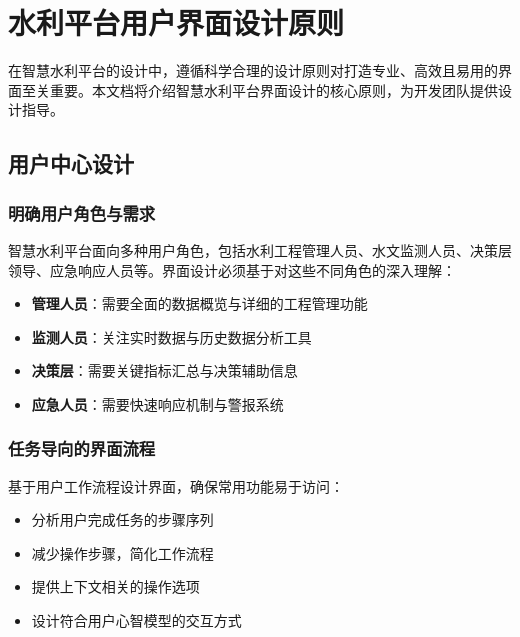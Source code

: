 \section{水利平台用户界面设计原则}\label{ux6c34ux5229ux5e73ux53f0ux7528ux6237ux754cux9762ux8bbeux8ba1ux539fux5219}

在智慧水利平台的设计中，遵循科学合理的设计原则对打造专业、高效且易用的界面至关重要。本文档将介绍智慧水利平台界面设计的核心原则，为开发团队提供设计指导。

\subsection{用户中心设计}\label{ux7528ux6237ux4e2dux5fc3ux8bbeux8ba1}

\subsubsection{明确用户角色与需求}\label{ux660eux786eux7528ux6237ux89d2ux8272ux4e0eux9700ux6c42}

智慧水利平台面向多种用户角色，包括水利工程管理人员、水文监测人员、决策层领导、应急响应人员等。界面设计必须基于对这些不同角色的深入理解：

\begin{itemize}
\tightlist
\item
  \textbf{管理人员}：需要全面的数据概览与详细的工程管理功能
\item
  \textbf{监测人员}：关注实时数据与历史数据分析工具
\item
  \textbf{决策层}：需要关键指标汇总与决策辅助信息
\item
  \textbf{应急人员}：需要快速响应机制与警报系统
\end{itemize}

\subsubsection{任务导向的界面流程}\label{ux4efbux52a1ux5bfcux5411ux7684ux754cux9762ux6d41ux7a0b}

基于用户工作流程设计界面，确保常用功能易于访问：

\begin{itemize}
\tightlist
\item
  分析用户完成任务的步骤序列
\item
  减少操作步骤，简化工作流程
\item
  提供上下文相关的操作选项
\item
  设计符合用户心智模型的交互方式
\end{itemize}


